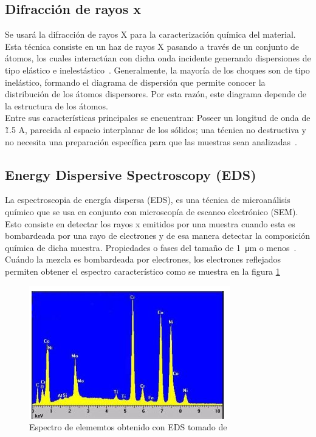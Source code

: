 \documentclass{article}
\begin{document}
\subsection{Difracción de rayos x}

Se usará la difracción de rayos X para la caracterización química del material. Esta técnica consiste en un haz de rayos X pasando a través de un conjunto de átomos, los cuales interactúan con dicha onda incidente generando dispersiones de tipo elástico e inelestástico~\cite{xrays}. Generalmente, la mayoría de los choques son de tipo inelástico, formando el diagrama de dispersión que permite conocer la distribución de los átomos dispersores. Por esta razón, este diagrama depende de la estructura de los átomos.\\

Entre sus características principales se encuentran: Poseer un longitud de onda de \~ 1.5 A, parecida al espacio interplanar de los sólidos; una técnica no destructiva y no necesita una preparación específica para que las muestras sean analizadas~\cite{xrays}. 

\subsection{Energy Dispersive Spectroscopy (EDS)}

La espectroscopia de energía dispersa (EDS), es una técnica de microanálisis químico que se usa en conjunto con microscopía de escaneo electrónico (SEM). Esto consiste en detectar los rayos x emitidos por una muestra cuando esta es  bombardeada por una rayo de electrones y de esa manera detectar la composición química de dicha muestra. Propiedades o fases del tamaño de \SI{1}{\micro\metre} o menos~\cite{EDS}.\\

Cuándo la mezcla es bombardeada por electrones, los electrones reflejados permiten obtener el espectro característico como se muestra en la figura \ref{EDS}\\ 

\begin{figure}
    \centering
    \includegraphics{Proyecto_final/Propuesta/EDSDiagram.png}
    \caption{Espectro de elememtos obtenido con EDS tomado de \cite{EDS}}
    \label{EDS}
\end{figure}
\end{document}
